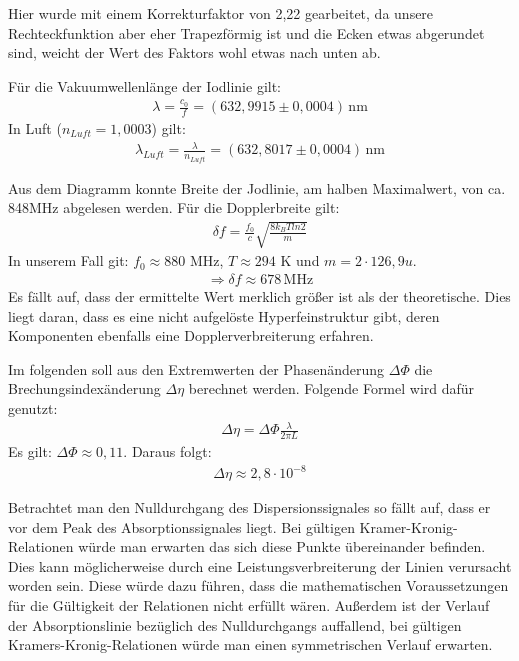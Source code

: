 Hier wurde mit einem Korrekturfaktor von 2,22 gearbeitet, da unsere Rechteckfunktion aber eher Trapezförmig ist und die Ecken etwas abgerundet sind, weicht der Wert des Faktors wohl etwas nach unten ab.

Für die Vakuumwellenlänge der Iodlinie gilt:
\begin{gather}
    \lambda = \frac{c_0}{f} = (632,9915 \pm 0,0004) \, \text{nm}
\end{gather}
In Luft ($n_{Luft} = 1,0003$) gilt:
\begin{gather}
    \lambda_{Luft} = \frac{\lambda}{n_{Luft}} = (632,8017 \pm 0,0004)\, \text{nm}
\end{gather}

Aus dem Diagramm konnte Breite der Jodlinie, am halben Maximalwert, von ca. 848MHz abgelesen werden.
Für die Dopplerbreite gilt:
\begin{gather}
    \delta f = \frac{f_0}{c} \sqrt{\frac{8 k_B T ln2}{m}}
\end{gather}
In unserem Fall git: $f_0 \approx 880$ MHz,  $T \approx 294$ K und $m = 2 \cdot 126,9 u$.
\begin{gather}
    \Rightarrow \delta f \approx 678 \, \text{MHz}
\end{gather}
Es fällt auf, dass der ermittelte Wert merklich größer ist als der theoretische. Dies liegt daran, dass es eine nicht aufgelöste Hyperfeinstruktur gibt, deren Komponenten ebenfalls eine Dopplerverbreiterung erfahren.


Im folgenden soll aus den Extremwerten der Phasenänderung $\Delta \Phi$ die Brechungsindexänderung $\Delta \eta$ berechnet werden. Folgende Formel wird dafür genutzt:
\begin{gather}
    \Delta \eta = \Delta \Phi \frac{\lambda}{2 \pi L}
\end{gather}
Es gilt: $\Delta \Phi \approx 0,11$. Daraus folgt:
\begin{gather}
    \Delta \eta \approx 2,8 \cdot 10^{-8}
\end{gather}

Betrachtet man den Nulldurchgang des Dispersionssignales so fällt auf, dass er vor dem Peak des Absorptionssignales liegt. Bei gültigen Kramer-Kronig-Relationen würde man erwarten das sich diese Punkte übereinander befinden. Dies kann möglicherweise durch eine Leistungsverbreiterung der Linien verursacht worden sein. Diese würde dazu führen, dass die mathematischen Voraussetzungen für die Gültigkeit der Relationen nicht erfüllt wären.
Außerdem ist der Verlauf der Absorptionslinie bezüglich des Nulldurchgangs auffallend, bei gültigen Kramers-Kronig-Relationen würde man einen symmetrischen Verlauf erwarten.
